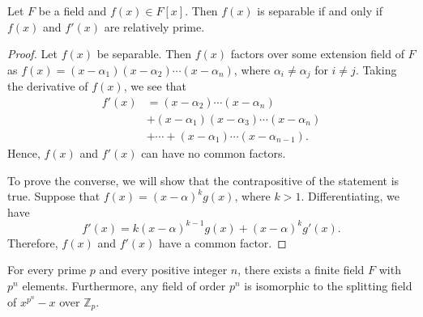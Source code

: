 \begin{lemma}\label{finite:separable_derivative_lemma}
Let $F$ be a field and $f(x) \in F[x]$.  Then $f(x)$ is separable if and only if $f(x)$ and $f'(x)$ are relatively prime. 
\end{lemma}


\begin{proof}
Let $f(x)$ be separable.  Then $f(x)$ factors over some extension field of $F$ as $f(x) = (x - \alpha_1) (x - \alpha_2) \cdots (x - \alpha_n)$, where $\alpha_i \neq \alpha_j$ for $i \neq j$. Taking the derivative
of $f(x)$, we see that
\begin{align*}
f'(x) & =  (x - \alpha_2) \cdots (x - \alpha_n) \\
&  +  (x - \alpha_1) (x - \alpha_3) \cdots (x - \alpha_n) \\
&  + \cdots + (x - \alpha_1) \cdots (x - \alpha_{n - 1}).
\end{align*}
Hence, $f(x)$ and $f'(x)$ can have no common factors.

To prove the converse, we will show that the contrapositive of the statement is true.  Suppose that $f(x) = (x - \alpha)^k g(x)$, where $k > 1$.  Differentiating, we have
\[
f'(x) = k ( x - \alpha)^{k-1} g(x) + (x- \alpha)^k g'(x).
\]
Therefore, $f(x)$ and $f'(x)$ have a common factor.
\end{proof}


\begin{theorem} 
For every  prime $p$ and every positive integer $n$, there exists a finite field $F$ with $p^n$ elements. Furthermore, any field of order $p^n$ is isomorphic to the splitting field of $x^{p^n} -x$ over ${\mathbb Z}_p$.
\end{theorem}
 
